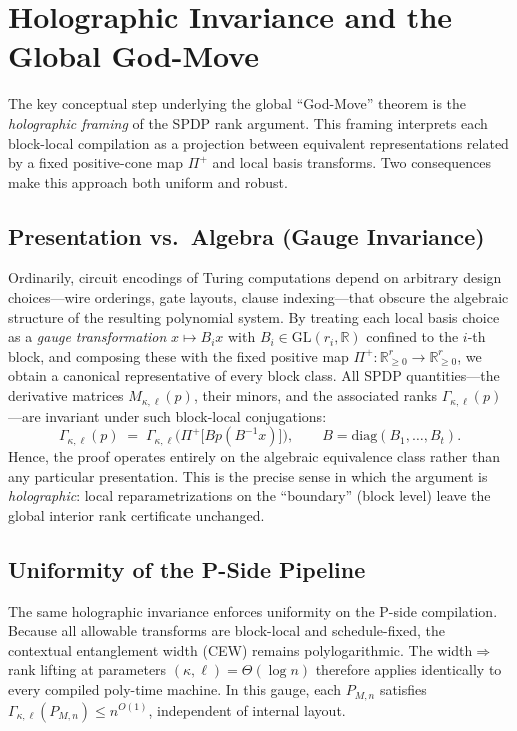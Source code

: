 \documentclass[12pt]{article}
\theoremstyle{definition}
\theoremstyle{definition}
\theoremstyle{remark}
\theoremstyle{remark}
\begin{document}
\section{Holographic Invariance and the Global God-Move}
\label{sec:holographic-godmove}

The key conceptual step underlying the global ``God-Move'' theorem is the
\emph{holographic framing} of the SPDP rank argument.  This framing interprets
each block-local compilation as a projection between equivalent representations
related by a fixed positive-cone map $\Pi^+$ and local basis transforms.
Two consequences make this approach both uniform and robust.

\subsection{Presentation vs.\ Algebra (Gauge Invariance)}
Ordinarily, circuit encodings of Turing computations depend on arbitrary design
choices---wire orderings, gate layouts, clause indexing---that obscure the
algebraic structure of the resulting polynomial system.
By treating each local basis choice as a \emph{gauge transformation}
$x \mapsto B_i x$ with $B_i \in \mathrm{GL}(r_i,\mathbb{R})$ confined to the
$i$-th block, and composing these with the fixed positive map
$\Pi^+: \mathbb{R}^r_{\ge 0} \to \mathbb{R}^r_{\ge 0}$,
we obtain a canonical representative of every block class.
All SPDP quantities---the derivative matrices $M_{\kappa,\ell}(p)$,
their minors, and the associated ranks $\Gamma_{\kappa,\ell}(p)$---are invariant
under such block-local conjugations:
\[
  \Gamma_{\kappa,\ell}(p) \;=\;
  \Gamma_{\kappa,\ell}\big(\Pi^+\!\big[Bp(B^{-1}x)\big]\big),
  \qquad B = \mathrm{diag}(B_1,\ldots,B_t).
\]
Hence, the proof operates entirely on the algebraic equivalence class rather
than any particular presentation.  This is the precise sense in which the
argument is \emph{holographic}: local reparametrizations on the ``boundary''
(block level) leave the global interior rank certificate unchanged.

\subsection{Uniformity of the P-Side Pipeline}
The same holographic invariance enforces uniformity on the P-side compilation.
Because all allowable transforms are block-local and schedule-fixed,
the contextual entanglement width (CEW) remains polylogarithmic.
The width$\Rightarrow$rank lifting at parameters
$(\kappa,\ell)=\Theta(\log n)$ therefore applies identically to every compiled
poly-time machine.  In this gauge, each $P_{M,n}$ satisfies
$\Gamma_{\kappa,\ell}(P_{M,n}) \le n^{O(1)}$, independent of internal layout.
\end{document}
